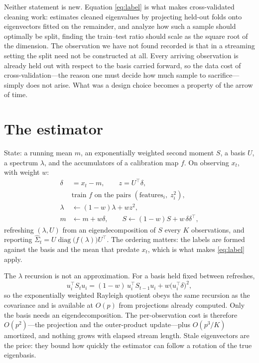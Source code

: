\documentclass[11pt]{article}
\begin{document}
Neither statement is new. Equation \eqref{eq:label} is what makes cross-validated cleaning work:
\citet{bartz2016} estimates cleaned eigenvalues by projecting held-out folds onto eigenvectors fitted
on the remainder, and \citet{lamrani2025holdout} analyze how such a sample should optimally be split,
finding the train--test ratio should scale as the square root of the dimension. The observation we
have not found recorded is that in a streaming setting the split need not be constructed at all.
Every arriving observation is already held out with respect to the basis carried forward, so the
data cost of cross-validation---the reason one must decide how much sample to sacrifice---simply does
not arise. What was a design choice becomes a property of the arrow of time.

\section{The estimator}

State: a running mean $m$, an exponentially weighted second moment $S$, a basis $U$, a spectrum
$\lambda$, and the accumulators of a calibration map $f$. On observing $x_t$, with weight $w$:
\begin{align*}
  \delta &= x_t - m, \qquad z = U^\top \delta, \\
  &\text{train } f \text{ on the pairs } (\text{features}_i,\; z_i^2), \\
  \lambda &\leftarrow (1-w)\lambda + w z^2, \\
  m &\leftarrow m + w\delta, \qquad S \leftarrow (1-w) S + w\, \delta \delta^\top,
\end{align*}
refreshing $(\lambda, U)$ from an eigendecomposition of $S$ every $K$ observations, and reporting
$\hat\Sigma_t = U \operatorname{diag}\bigl(f(\lambda)\bigr) U^\top$. The ordering matters: the labels
are formed against the basis and the mean that predate $x_t$, which is what makes \eqref{eq:label}
apply.

The $\lambda$ recursion is not an approximation. For a basis held fixed between refreshes,
\[
  u_i^\top S_t u_i = (1-w)\, u_i^\top S_{t-1} u_i + w \bigl(u_i^\top \delta\bigr)^2 ,
\]
so the exponentially weighted Rayleigh quotient obeys the same recursion as the covariance and is
available at $O(p)$ from projections already computed. Only the basis needs an eigendecomposition.
The per-observation cost is therefore $O(p^2)$---the projection and the outer-product
update---plus $O(p^3/K)$ amortized, and nothing grows with elapsed stream length. Stale eigenvectors
are the price: they bound how quickly the estimator can follow a rotation of the true eigenbasis.
\end{document}
